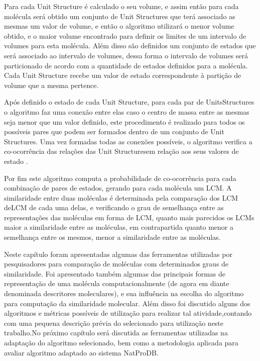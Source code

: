 Para cada Unit Structure é calculado o seu volume, e assim então para cada molécula 
será obtido um conjunto de Unit Structures que terá associado as mesmas um valor de 
volume, e então o algoritmo utilizará o menor volume obtido, e o maior volume encontrado 
para definir os limites de um intervalo de volumes para esta molécula. Além disso são 
definidos um conjunto de estados que será associado ao intervalo de volumes, dessa forma o 
intervalo de volumes será particionado de acordo com a quantidade de estados definidos para 
a molécula. Cada Unit Structure recebe um valor de estado correspondente à partição de 
volume que a mesma pertence.

Após definido o estado de cada Unit Structure, para cada par de UnitsStructures o
algoritmo faz uma conexão entre elas caso o centro de massa entre as mesmas seja menor que 
um valor definido, este procedimento é realizado para todos os possíveis pares que podem ser 
formados dentro de um conjunto de Unit Structures. Uma vez formadas todas as conexões 
possíveis, o algoritmo verifica a co-ocorrência das relações das Unit Structuresem relação aos seus valores de estado \cite{huang2008localized}.

Por fim este algoritmo computa a probabilidade de co-ocorrência para cada
combinação de pares de estados, gerando para cada molécula um LCM. A similaridade entre 
duas moléculas é determinada pela comparação dos LCM deLCM de cada uma delas, e 
verificando o grau de semelhança entre as representações das moléculas em forma de LCM, 
quanto mais parecidos os LCMs maior a similaridade entre as moléculas, em contrapartida 
quanto menor a semelhança entre os mesmos, menor a similaridade entre as moléculas.





Neste capítulo foram apresentadas algumas das ferramentas utilizadas por pesquisadores
para comparação de moléculas com determinados graus de similaridade. Foi apresentado 
também algumas das principais formas de representação de uma molécula 
computacionalmente (de agora em diante denominada descritores moleculares), e sua 
influência na escolha do algoritmo para computação da similaridade molecular. Além disso 
foi discutido alguns dos algoritmos e métricas possíveis de utilização para realizar tal atividade,contando com uma pequena descrição prévia do selecionado para utilização neste trabalho.No próximo capítulo será discutida as ferramentas utilizadas na adaptação do algoritmo selecionado, bem como a metodologia aplicada para avaliar algoritmo adaptado 
ao sistema NatProDB.


